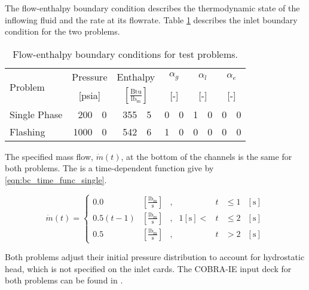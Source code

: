 The flow-enthalpy boundary condition describes the thermodynamic state of the inflowing fluid and the rate at its flowrate.
Table \ref{tab:bc_fe} describes the inlet boundary condition for the two problems.

\begin{table}[h!t]
\centering
\begin{tabular}{@{}lr@{.}lr@{.}lr@{.}lr@{.}lr@{.}l@{}} \toprule
\multirow{2}{*}{Problem} & \multicolumn{2}{c}{Pressure} & \multicolumn{2}{c}{Enthalpy}             & \multicolumn{2}{c}{$\alpha_g$} & \multicolumn{2}{c}{$\alpha_l$} & \multicolumn{2}{c}{$\alpha_e$} \\ 
                         & \multicolumn{2}{c}{[psia]} & \multicolumn{2}{c}{$[\frac{\text{Btu}}{\text{lb}_{\text{m}}}]$} & \multicolumn{2}{c}{[-]}      & \multicolumn{2}{c}{[-]}      & \multicolumn{2}{c}{[-]}      \\ \midrule
Single Phase             &  200&0                       &  355&5                                   & 0&0                            & 1&0                            & 0&0 \\
Flashing                 & 1000&0                       &  542&6                                   & 1&0                            & 0&0                            & 0&0 \\ \bottomrule  
\end{tabular}
\caption{Flow-enthalpy boundary conditions for test problems.}
\label{tab:bc_fe}
\end{table}

The specified mass flow, $\dot{m}(t)$, at the bottom of the channels is the same for both problems. 
The is a time-dependent function give by \eqref{eqn:bc_time_func_single}.

\begin{equation}
\label{eqn:bc_time_func_single}
\dot{m}(t) = \left\{
\begin{array}{cclrcll}
 0.0           & [\frac{\text{lb}_{\text{m}}}{\text{s}}] & , &         & t & \leq 1 &[\text{s}] \\
 0.5 ( t - 1)  & [\frac{\text{lb}_{\text{m}}}{\text{s}}] & , & 1 [\text{s}] < & t & \leq 2 &[\text{s}] \\
 0.5           & [\frac{\text{lb}_{\text{m}}}{\text{s}}] & , &         & t & > 2    &[\text{s}]
\end{array}\right.
\end{equation}

Both problems adjust their initial pressure distribution to account for hydrostatic head, which is not specified on the inlet cards.
The COBRA-IE input deck for both problems can be found in .

